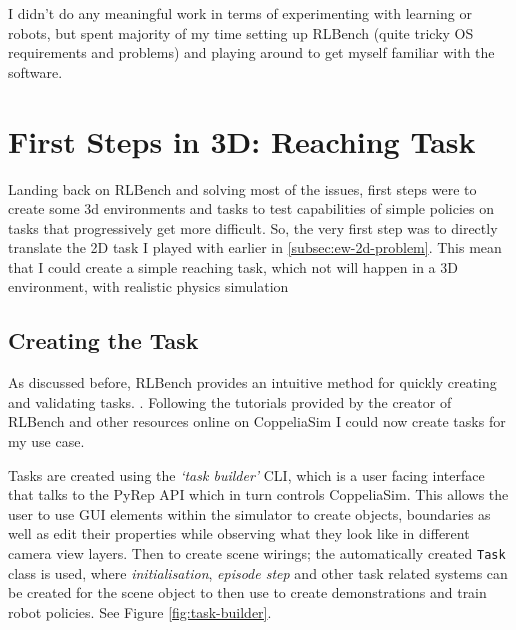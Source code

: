 I didn't do any meaningful work in terms of experimenting with learning or robots, but spent majority of my time setting up RLBench (quite tricky OS requirements and problems) and playing around to get myself familiar with the software. 



\section{First Steps in 3D: Reaching Task}
Landing back on RLBench and solving most of the issues, first steps were to create some 3d environments and tasks to test capabilities of simple policies on tasks that progressively get more difficult. So, the very first step was to directly translate the 2D task I played with earlier in \ref{subsec:ew-2d-problem}. This mean that I could create a simple reaching task, which not will happen in a 3D environment, with realistic physics simulation

\subsection{Creating the Task}
As discussed before, RLBench provides an intuitive method for quickly creating and validating tasks. . Following the tutorials provided by the creator of RLBench and other resources online on CoppeliaSim  I could now create tasks for my use case.

Tasks are created using the \emph{`task builder'} CLI, which is a user facing interface that talks to the PyRep API which in turn controls CoppeliaSim. This allows the user to use GUI elements within the simulator to create objects, boundaries as well as edit their properties while observing what they look like in different camera view layers. Then to create scene wirings; the automatically created \verb|Task| class is used, where \emph{initialisation}, \emph{episode step} and other task related systems can be created for the scene object to then use to create demonstrations and train robot policies. See Figure \ref{fig:task-builder}.

